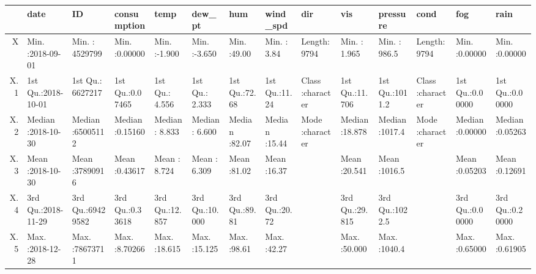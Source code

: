 \begin{table}[ht]
\centering
\begin{tabular}{rlllllllllllll}
  \hline
 &      date &       ID &  consumption &      temp &     dew\_pt &      hum &    wind\_spd &     dir &      vis &    pressure &     cond &      fog &      rain \\ 
  \hline
X & Min.   :2018-09-01   & Min.   : 4529799   & Min.   :0.00000   & Min.   :-1.900   & Min.   :-3.650   & Min.   :49.00   & Min.   : 3.84   & Length:9794        & Min.   : 1.965   & Min.   : 986.5   & Length:9794        & Min.   :0.00000   & Min.   :0.00000   \\ 
  X.1 & 1st Qu.:2018-10-01   & 1st Qu.: 6627217   & 1st Qu.:0.07465   & 1st Qu.: 4.556   & 1st Qu.: 2.333   & 1st Qu.:72.68   & 1st Qu.:11.24   & Class :character   & 1st Qu.:11.706   & 1st Qu.:1011.2   & Class :character   & 1st Qu.:0.00000   & 1st Qu.:0.00000   \\ 
  X.2 & Median :2018-10-30   & Median :65005112   & Median :0.15160   & Median : 8.833   & Median : 6.600   & Median :82.07   & Median :15.44   & Mode  :character   & Median :18.878   & Median :1017.4   & Mode  :character   & Median :0.00000   & Median :0.05263   \\ 
  X.3 & Mean   :2018-10-30   & Mean   :37890916   & Mean   :0.43617   & Mean   : 8.724   & Mean   : 6.309   & Mean   :81.02   & Mean   :16.37   &  & Mean   :20.541   & Mean   :1016.5   &  & Mean   :0.05203   & Mean   :0.12691   \\ 
  X.4 & 3rd Qu.:2018-11-29   & 3rd Qu.:69429582   & 3rd Qu.:0.33618   & 3rd Qu.:12.857   & 3rd Qu.:10.000   & 3rd Qu.:89.81   & 3rd Qu.:20.72   &  & 3rd Qu.:29.815   & 3rd Qu.:1022.5   &  & 3rd Qu.:0.00000   & 3rd Qu.:0.20000   \\ 
  X.5 & Max.   :2018-12-28   & Max.   :78673711   & Max.   :8.70266   & Max.   :18.615   & Max.   :15.125   & Max.   :98.61   & Max.   :42.27   &  & Max.   :50.000   & Max.   :1040.4   &  & Max.   :0.65000   & Max.   :0.61905   \\ 
   \hline
\end{tabular}
\end{table}
